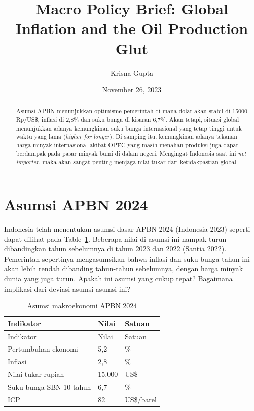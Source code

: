 \documentclass[
  a4paper,
  DIV=11,
  numbers=noendperiod]{scrreprt}
\title{Macro Policy Brief: Global Inflation and the Oil Production Glut}
\author{Krisna Gupta}
\date{November 26, 2023}
\begin{document}
\maketitle
\begin{abstract}
Asumsi APBN menunjukkan optimisme pemerintah di mana dolar akan stabil
di 15000 Rp/US\$, inflasi di 2,8\% dan suku bunga di kisaran 6,7\%. Akan
tetapi, situasi global menunjukkan adanya kemungkinan suku bunga
internasional yang tetap tinggi untuk waktu yang lama (\emph{higher for
longer}). Di samping itu, kemungkinan adanya tekanan harga minyak
internasional akibat OPEC yang masih menahan produksi juga dapat
berdampak pada pasar minyak bumi di dalam negeri. Mengingat Indonesia
saat ini \emph{net importer}, maka akan sangat penting menjaga nilai
tukar dari ketidakpastian global.
\end{abstract}
\ifdefined\Shaded\renewenvironment{Shaded}{\begin{tcolorbox}[breakable, sharp corners, interior hidden, borderline west={3pt}{0pt}{shadecolor}, boxrule=0pt, enhanced, frame hidden]}{\end{tcolorbox}}\fi

\hypertarget{asumsi-apbn-2024}{%
\section{Asumsi APBN 2024}\label{asumsi-apbn-2024}}

Indonesia telah menentukan asumsi dasar APBN 2024 (Indonesia 2023)
seperti dapat dilihat pada Table~\ref{tbl-1}. Beberapa nilai di asumsi
ini nampak turun dibandingkan tahun sebelumnya di tahun 2023 dan 2022
(Santia 2022). Pemerintah sepertinya mengasumsikan bahwa inflasi dan
suku bunga tahun ini akan lebih rendah dibanding tahun-tahun sebelumnya,
dengan harga minyak dunia yang juga turun. Apakah ini asumsi yang cukup
tepat? Bagaimana implikasi dari deviasi asumsi-asumsi ini?

\hypertarget{tbl-1}{}
\begin{longtable}[]{@{}lll@{}}
\caption{\label{tbl-1}Asumsi makroekonomi APBN 2024}\tabularnewline
\toprule\noalign{}
Indikator & Nilai & Satuan \\
\midrule\noalign{}
\endfirsthead
\toprule\noalign{}
Indikator & Nilai & Satuan \\
\midrule\noalign{}
\endhead
\bottomrule\noalign{}
\endlastfoot
Pertumbuhan ekonomi & 5,2 & \% \\
Inflasi & 2,8 & \% \\
Nilai tukar rupiah & 15.000 & US\$ \\
Suku bunga SBN 10 tahun & 6,7 & \% \\
ICP & 82 & US\$/barel \\
\end{longtable}
\end{document}
